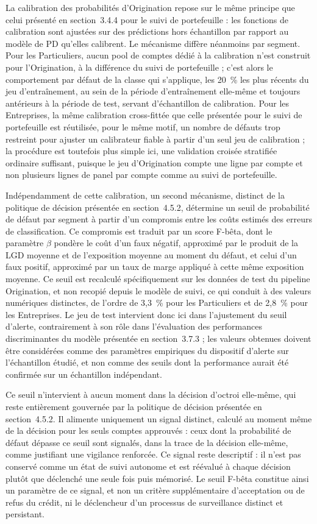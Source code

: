 La calibration des probabilités d'Origination repose sur le même principe que celui présenté en section~3.4.4 pour le suivi de portefeuille : les fonctions de calibration sont ajustées sur des prédictions hors échantillon par rapport au modèle de PD qu'elles calibrent. Le mécanisme diffère néanmoins par segment. Pour les Particuliers, aucun pool de comptes dédié à la calibration n'est construit pour l'Origination, à la différence du suivi de portefeuille ; c'est alors le comportement par défaut de la classe qui s'applique, les 20~\% les plus récents du jeu d'entraînement, au sein de la période d'entraînement elle-même et toujours antérieurs à la période de test, servant d'échantillon de calibration. Pour les Entreprises, la même calibration cross-fittée que celle présentée pour le suivi de portefeuille est réutilisée, pour le même motif, un nombre de défauts trop restreint pour ajuster un calibrateur fiable à partir d'un seul jeu de calibration ; la procédure est toutefois plus simple ici, une validation croisée stratifiée ordinaire suffisant, puisque le jeu d'Origination compte une ligne par compte et non plusieurs lignes de panel par compte comme au suivi de portefeuille.

Indépendamment de cette calibration, un second mécanisme, distinct de la politique de décision présentée en section~4.5.2, détermine un seuil de probabilité de défaut par segment à partir d'un compromis entre les coûts estimés des erreurs de classification. Ce compromis est traduit par un score F-bêta, dont le paramètre $\beta$ pondère le coût d'un faux négatif, approximé par le produit de la LGD moyenne et de l'exposition moyenne au moment du défaut, et celui d'un faux positif, approximé par un taux de marge appliqué à cette même exposition moyenne. Ce seuil est recalculé spécifiquement sur les données de test du pipeline Origination, et non recopié depuis le modèle de suivi, ce qui conduit à des valeurs numériques distinctes, de l'ordre de 3,3~\% pour les Particuliers et de 2,8~\% pour les Entreprises. Le jeu de test intervient donc ici dans l'ajustement du seuil d'alerte, contrairement à son rôle dans l'évaluation des performances discriminantes du modèle présentée en section~3.7.3 ; les valeurs obtenues doivent être considérées comme des paramètres empiriques du dispositif d'alerte sur l'échantillon étudié, et non comme des seuils dont la performance aurait été confirmée sur un échantillon indépendant.

Ce seuil n'intervient à aucun moment dans la décision d'octroi elle-même, qui reste entièrement gouvernée par la politique de décision présentée en section~4.5.2. Il alimente uniquement un signal distinct, calculé au moment même de la décision pour les seuls comptes approuvés : ceux dont la probabilité de défaut dépasse ce seuil sont signalés, dans la trace de la décision elle-même, comme justifiant une vigilance renforcée. Ce signal reste descriptif : il n'est pas conservé comme un état de suivi autonome et est réévalué à chaque décision plutôt que déclenché une seule fois puis mémorisé. Le seuil F-bêta constitue ainsi un paramètre de ce signal, et non un critère supplémentaire d'acceptation ou de refus du crédit, ni le déclencheur d'un processus de surveillance distinct et persistant.

